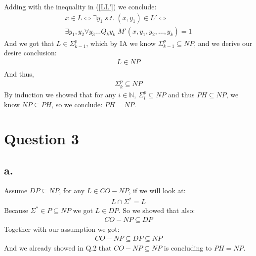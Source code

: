 \documentclass[11pt]{article}
\theoremstyle{plain}
\theoremstyle{nonumberplainnobrackets}
\begin{document}
Adding with the inequality in (\ref{LL'})  we conclude:
\begin{align*}
x\in L \iff \exists y_1 \; s.t.\; (x,y_1) \in L' \iff \\
\exists y_1,y_2  \forall y_3\ldots Q_ky_k \;M'(x,y_1,y_2,\ldots,y_k) =1 
\end{align*}
And we got that $L\in \Sigma_{k-1}^p$, which by IA we know $\Sigma_{k-1}^p\subseteq NP$, and we derive our desire conclusion:
\begin{align*}
L\in NP \\
\end{align*}
And thus,
\begin{align*}
\Sigma_k^p \subseteq NP
\end{align*}
By induction we showed that for any $i\in \mathbb{N}$, $\Sigma_i^p\subseteq NP$ and thus $PH\subseteq NP$, we know $NP\subseteq PH$, so we conclude: $PH= NP$.
\section*{Question 3}
\subsection*{a. }
Assume $DP\subseteq NP$, for any $L\in CO-NP$, if we will look at: \begin{align*}
	L\cap \Sigma^* = L
\end{align*}
Because $\Sigma^*\in P \subseteq NP$ we got $L\in DP$. So we showed that also:\
\begin{align*}
CO-NP \subseteq DP
\end{align*}
Together with our assumption we got:
\begin{align*}
CO-NP \subseteq DP \subseteq NP
\end{align*}
And we already showed in Q.2 that $CO-NP \subseteq NP$ is concluding to $PH=NP$.
\end{document}
